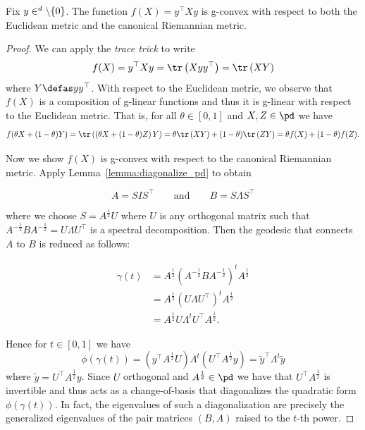 \documentclass[twoside,11pt]{article}
\begin{document}
\begin{prop}\label{prop:quad_gcvx}
    Fix $y \in \real^d\setminus\{0\}$. The function $f(X) = y^\top X y$ is g-convex with respect to both the Euclidean metric and the canonical Riemannian metric.
\end{prop}
\begin{proof}
    We can apply the \textit{trace trick} to write
    \[
    f(X) = y^\top X y = \tr\left(X y y^\top\right) = \tr\left(X Y\right)
    \]
    where $Y \defas y y^\top$. With respect to the Euclidean metric, we observe that $f(X)$ is a composition of g-linear functions and thus it is g-linear with respect to the Euclidean metric. That is, for all $\theta \in [0,1]$ and $X,Z \in \pd$ we have 
    \[
    f(\theta X + (1-\theta)Y) = \tr\left( \left(\theta X + (1-\theta)Z\right)Y\right) = \theta \tr\left(XY\right) + (1-\theta)\tr \left(ZY\right) = \theta f(X) + (1-\theta) f(Z).
    \]

    Now we show $f(X)$ is g-convex with respect to the canonical Riemannian metric. Apply Lemma~\ref{lemma:diagonalize_pd} to obtain 

    \[
     A = S I S^\top \qquad \text{and} \qquad B = S \Lambda S^\top
    \]

    where we choose $S = A^{\frac{1}{2}} U$ where $U$ is any orthogonal matrix such that $A^{-\frac{1}{2}}B A^{-\frac{1}{2}} = U \Lambda U^\top$ is a spectral decomposition. Then the geodesic that connects $A$ to $B$ is reduced as follows:

    \begin{align*}
    \begin{split}
        \gamma(t)  &= A^{\frac{1}{2}}\left(A^{-\frac{1}{2}}B A^{-\frac{1}{2}}\right)^tA^{\frac{1}{2}}
        \\ &= A^{\frac{1}{2}} \left(U \Lambda U^\top \right)^t A^{\frac{1}{2}}
        \\ &= A^{\frac{1}{2}} U \Lambda^t U^\top A^{\frac{1}{2}}. 
    \end{split}
\end{align*}

Hence for $t \in [0,1]$ we have 
\begin{equation*}
    \phi(\gamma(t)) = \left( y^\top  A^{\frac{1}{2}} U  \right) \Lambda^t \left(U^\top A^{\frac{1}{2}}y \right) = \tilde{y}^\top \Lambda^t \tilde{y}
\end{equation*}
where $\tilde{y} = U^\top A^{\frac{1}{2}}y$. Since $U$ orthogonal and $A^{\frac{1}{2}} \in \pd$ we have that $U^\top A^{\frac{1}{2}}$ is invertible and thus acts as a change-of-basis that diagonalizes the quadratic form $\phi(\gamma(t))$. In fact, the eigenvalues of such a diagonalization are precisely the generalized eigenvalues of the pair matrices $(B, A)$ raised to the $t$-th power.


\end{proof}
\end{document}

